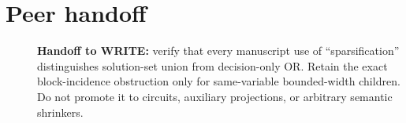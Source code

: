 \documentclass[11pt]{article}
\begin{document}
\section{Peer handoff}
\begin{description}
\item[] \textbf{Handoff to WRITE:} verify that every manuscript use of
``sparsification'' distinguishes solution-set union from decision-only OR.
Retain the exact block-incidence obstruction only for same-variable
bounded-width children.  Do not promote it to circuits, auxiliary projections,
or arbitrary semantic shrinkers.
\end{description}



\end{document}
